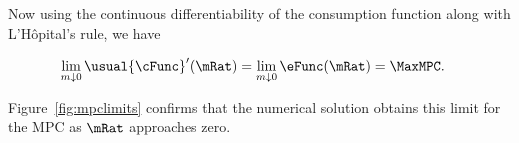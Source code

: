 \documentclass[BufferStockTheory]{subfiles}
\begin{document}
Now using the continuous differentiability of the consumption function
along with L'H\^opital's rule, we have
\begin{comment}
  \begin{align*}
    \eFunc^{\prime}(\mRat)  & = \mRat^{-1} \usual{\cFunc}^{\prime}(\mRat) - \mRat^{-2} \usual{\cFunc}(\mRat)
    \\ \mRat \eFunc^{\prime}(\mRat)  & = \usual{\cFunc}^{\prime}(\mRat) - \usual{\cFunc}(\mRat)/\mRat
    \\ \usual{\cFunc}^{\prime}(\mRat)  & = \eFunc(\mRat)+ \mRat \eFunc^{\prime}(\mRat)
  \end{align*}
  and since $0<\eFunc(\mRat)<1$ we have
\end{comment}
\begin{align*}
  \lim_{m \downarrow 0} \usual{\cFunc}^{\prime}(\mRat)  & = \lim_{m \downarrow 0}
                                                  \eFunc(\mRat) = \MaxMPC.
\end{align*}

Figure~\ref{fig:mpclimits} confirms that the numerical solution obtains this limit for the MPC as $\mRat$ approaches zero.
\end{document}
